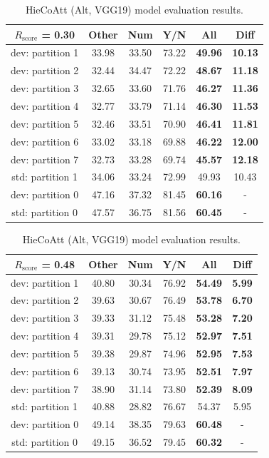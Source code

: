 \documentclass[letterpaper]{article}
\newcommand{\rscore}{}\def\rscore/{$R_{\text{score}}$}
\begin{document}
\begin{table}
	\begin{subtable}{0.49\linewidth}
		\begin{tabular}{c | c c c c | c}
			\rscore/ = 0.30  & Other & Num   & Y/N   & All            & Diff           \\ [0.5ex]
			\hline
			dev: partition 1 & 33.98 & 33.50 & 73.22 & \textbf{49.96} & \textbf{10.13} \\
			dev: partition 2 & 32.44 & 34.47 & 72.22 & \textbf{48.67} & \textbf{11.18} \\
			dev: partition 3 & 32.65 & 33.60 & 71.76 & \textbf{46.27} & \textbf{11.36} \\
			dev: partition 4 & 32.77 & 33.79 & 71.14 & \textbf{46.30} & \textbf{11.53} \\
			dev: partition 5 & 32.46 & 33.51 & 70.90 & \textbf{46.41} & \textbf{11.81} \\
			dev: partition 6 & 33.02 & 33.18 & 69.88 & \textbf{46.22} & \textbf{12.00} \\
			dev: partition 7 & 32.73 & 33.28 & 69.74 & \textbf{45.57} & \textbf{12.18} \\
			\hline
			std: partition 1 & 34.06 & 33.24 & 72.99 & 49.93          & 10.43          \\
			\hline
			dev: partition 0 & 47.16 & 37.32 & 81.45 & \textbf{60.16} & -              \\
			std: partition 0 & 47.57 & 36.75 & 81.56 & \textbf{60.45} & -              \\
			\hline
		\end{tabular}
		\caption{MUTAN without Attention model evaluation results.}

		\begin{tabular}{c | c c c c | c}
			\rscore/ = 0.48  & Other & Num   & Y/N   & All            & Diff          \\ [0.5ex]
			\hline
			dev: partition 1 & 40.80 & 30.34 & 76.92 & \textbf{54.49} & \textbf{5.99} \\
			dev: partition 2 & 39.63 & 30.67 & 76.49 & \textbf{53.78} & \textbf{6.70} \\
			dev: partition 3 & 39.33 & 31.12 & 75.48 & \textbf{53.28} & \textbf{7.20} \\
			dev: partition 4 & 39.31 & 29.78 & 75.12 & \textbf{52.97} & \textbf{7.51} \\
			dev: partition 5 & 39.38 & 29.87 & 74.96 & \textbf{52.95} & \textbf{7.53} \\
			dev: partition 6 & 39.13 & 30.74 & 73.95 & \textbf{52.51} & \textbf{7.97} \\
			dev: partition 7 & 38.90 & 31.14 & 73.80 & \textbf{52.39} & \textbf{8.09} \\
			\hline
			std: partition 1 & 40.88 & 28.82 & 76.67 & 54.37          & 5.95          \\
			\hline
			dev: partition 0 & 49.14 & 38.35 & 79.63 & \textbf{60.48} & -             \\
			std: partition 0 & 49.15 & 36.52 & 79.45 & \textbf{60.32} & -             \\
			\hline
		\end{tabular}
		\caption{HieCoAtt (Alt, VGG19) model evaluation results.}


\end{subtable}
\end{table}
\end{document}
